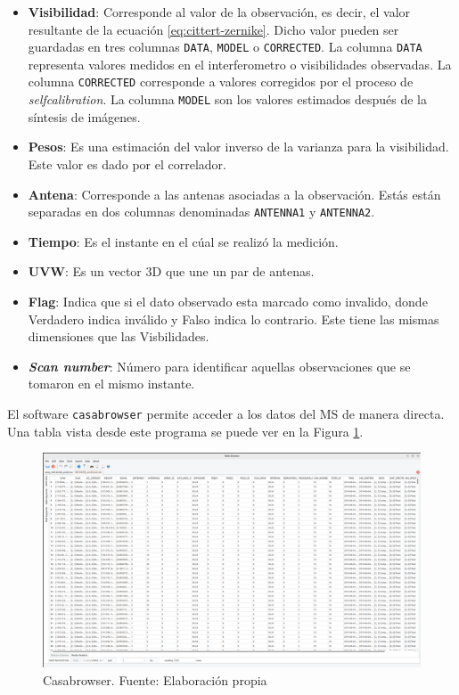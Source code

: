 \begin{itemize}
    \item \textbf{Visibilidad}: Corresponde al valor de la observación, es decir, el valor resultante de la ecuación \ref{eq:cittert-zernike}. Dicho valor pueden ser guardadas en tres columnas \texttt{DATA}, \texttt{MODEL} o \texttt{CORRECTED}. La columna \texttt{DATA} representa valores medidos en el interferometro o visibilidades observadas. La columna \texttt{CORRECTED} corresponde a valores corregidos por el proceso de {\it selfcalibration}. La columna \texttt{MODEL} son los valores estimados después de la síntesis de imágenes.
    \item \textbf{Pesos}: Es una estimación del valor inverso de la varianza para la visibilidad. Este valor es dado por el correlador. 
    \item \textbf{Antena}: Corresponde a las antenas asociadas a la observación. Estás están separadas en dos columnas denominadas \texttt{ANTENNA1} y \texttt{ANTENNA2}.
    \item \textbf{Tiempo}: Es el instante en el cúal se realizó la medición. 
    \item \textbf{UVW}: Es un vector 3D que une un par de antenas. 
    \item \textbf{Flag}: Indica que si el dato observado esta marcado como invalido, donde Verdadero indica inválido y Falso indica lo contrario. Este tiene las mismas dimensiones que las Visbilidades. 
    \item \textbf{\textit{Scan number}}: Número para identificar aquellas observaciones que se tomaron en el mismo instante. 
\end{itemize}

El software \texttt{casabrowser} \citep{casabrowser} permite acceder a los datos del MS de manera directa. Una tabla vista desde este programa se puede ver en la Figura \ref{fig:casabrowser}. 

\begin{figure}[!ht]
	\centering
	\captionsetup{justification=centering}
	\includegraphics[scale=0.22]{images/casabrowser.png}
	\caption[Casabrowser]{Casabrowser. Fuente: Elaboración propia}
	\label{fig:casabrowser}
\end{figure}



